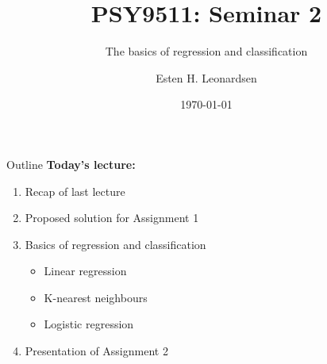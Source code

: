 \documentclass[10pt]{beamer}
\title{PSY9511: Seminar 2}
\subtitle{The basics of regression and classification}
\author{Esten H. Leonardsen}
\date{\today}
\begin{document}
	\begin{frame}
	 	\titlepage
	\end{frame}

    \begin{frame}{Outline}
        \textbf{Today's lecture:}
        \begin{enumerate}
            \item Recap of last lecture
            \item Proposed solution for Assignment 1
            \item Basics of regression and classification
            \begin{itemize}
                \item Linear regression
                \item K-nearest neighbours
                \item Logistic regression
            \end{itemize}
            \item Presentation of Assignment 2
        \end{enumerate}
    \end{frame}

    
    
    
    
    
\end{document}
